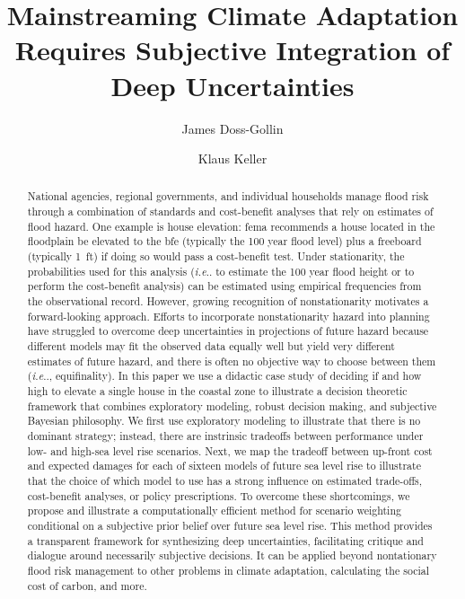 \documentclass[12pt]{article}
\title{Mainstreaming Climate Adaptation Requires Subjective Integration of Deep Uncertainties}
\author[1]{James Doss-Gollin}
\author[2]{Klaus Keller}
\affil[1]{Department of Civil and Environmental Engineering, Rice University}
\affil[2]{Thayer School of Engineering, Dartmouth College}
\makeatletter
\DeclareRobustCommand\onedot{\futurelet\@let@token\@onedot}
\def\@onedot{\ifx\@let@token.\else.\null\fi\xspace}
\def\ie{\emph{i.e}\onedot} \def\Ie{\emph{I.e}\onedot}
\DeclareRobustCommand\onedot{\futurelet\@let@token\@onedot}
\def\@onedot{\ifx\@let@token.\else.\null\fi\xspace}
\def\ie{\emph{i.e}\onedot} \def\Ie{\emph{I.e}\onedot}
\makeatother
\begin{document}
\maketitle
\thispagestyle{empty}

\begin{abstract}
    National agencies, regional governments, and individual households manage flood risk through a combination of standards and cost-benefit analyses that rely on estimates of flood hazard.
    One example is house elevation: \acrlong{fema} recommends a house located in the floodplain be elevated to the \acrlong{bfe} (typically the 100 year flood level) plus a freeboard (typically \SI{1}{ft}) if doing so would pass a cost-benefit test.
    Under stationarity, the probabilities used for this analysis (\ie to estimate the 100 year flood height or to perform the cost-benefit analysis) can be estimated using empirical frequencies from the observational record.
    However, growing recognition of nonstationarity motivates a forward-looking approach.
    Efforts to incorporate nonstationarity hazard into planning have struggled to overcome deep uncertainties in projections of future hazard because different models  may fit the observed data equally well but yield very different estimates of future hazard, and there is often no objective way to choose between them (\ie, equifinality).
    In this paper we use a didactic case study of deciding if and how high to elevate a single house in the coastal zone to illustrate a decision theoretic framework that combines exploratory modeling, robust decision making, and subjective Bayesian philosophy.
    We first use exploratory modeling to illustrate that there is no dominant strategy; instead, there are instrinsic tradeoffs between performance under low- and high-sea level rise scenarios.
    Next, we map the tradeoff between up-front cost and expected damages for each of sixteen models of future sea level rise to illustrate that the choice of which model to use has a strong influence on estimated trade-offs, cost-benefit analyses, or policy prescriptions.
    To overcome these shortcomings, we propose and illustrate a computationally efficient method for scenario weighting conditional on a subjective prior belief over future sea level rise.
    This method provides a transparent framework for synthesizing deep uncertainties, facilitating critique and dialogue around necessarily subjective decisions.
    It can be applied beyond nontationary flood risk management to other problems in climate adaptation, calculating the social cost of carbon, and more.
\end{abstract}
\end{document}
